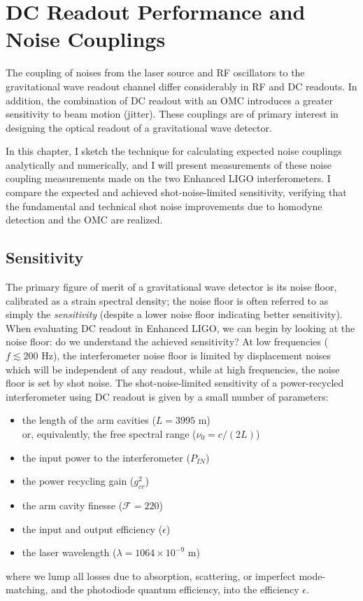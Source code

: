 \chapter{DC Readout Performance and Noise Couplings}
\label{chapter5}

The coupling of noises from the laser source and RF oscillators to the
gravitational wave readout channel differ considerably in RF and DC
readouts.  In addition, the combination of DC readout with an OMC
introduces a greater sensitivity to beam motion (jitter).  These
couplings are of primary interest in designing the optical readout of
a gravitational wave detector.  

In this chapter, I sketch the technique for calculating expected noise
couplings analytically and numerically, and I will present
measurements of these noise coupling measurements made on the two
Enhanced LIGO interferometers.  I compare the expected and achieved
shot-noise-limited sensitivity, verifying that the fundamental and
technical shot noise improvements due to homodyne detection and the OMC
are realized.

\section{Sensitivity}

The primary figure of merit of a gravitational wave detector is its
noise floor, calibrated as a strain spectral density; the noise floor
is often referred to as simply the \emph{sensitivity} (despite a lower
noise floor indicating better sensitivity).  When evaluating DC
readout in Enhanced LIGO, we can begin by looking at the noise floor:
do we understand the achieved sensitivity?  At low frequencies
($f\lesssim200\text{ Hz}$), the interferometer noise floor is limited
by displacement noises which will be independent of any readout, while
at high frequencies, the noise floor is set by shot noise.  The
shot-noise-limited sensitivity of a power-recycled interferometer
using DC readout is given by a small number of parameters:

\begin{itemize}
\item the length of the arm cavities ($L = 3995$ m)\\ or,
  equivalently, the free spectral range ($\nu_0 = c/(2L)$)
\item the input power to the interferometer ($P_{IN}$)
\item the power recycling gain ($g_{cr}^2$)
\item the arm cavity finesse ($\mathcal{F} = 220$)
\item the input and output efficiency ($\epsilon$)
\item the laser wavelength ($\lambda = 1064\times10^{-9}$ m)
\end{itemize}
where we lump all losses due to absorption, scattering, or imperfect
mode-matching, and the photodiode quantum efficiency, into the efficiency
$\epsilon$.

